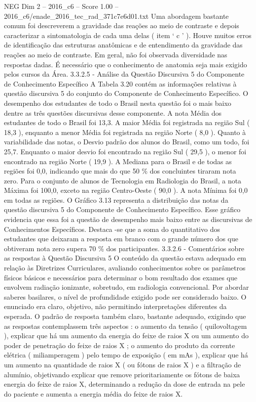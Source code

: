 \begin{textsample}{NEG Dim 2 – 2016\_c6 – Score 1.00 – 2016\_c6/enade\_2016\_tec\_rad\_371c7e6d01.txt}
Uma abordagem bastante comum foi descreverem a gravidade das reações ao meio de contraste e depois caracterizar a sintomatologia de cada uma delas ( item ‘ c ’ ).
Houve muitos erros de identificação das estruturas anatômicas e de entendimento da gravidade das reações ao meio de contraste.
Em geral, não foi observada diversidade nas respostas dadas.
É necessário que o conhecimento de anatomia seja mais exigido pelos cursos da Área. 3.3.2.5 - Análise da Questão Discursiva 5 do Componente de Conhecimento Específico A Tabela 3.20 contém as informações relativas à questão discursiva 5 do conjunto do Componente de Conhecimento Específico.
O desempenho dos estudantes de todo o Brasil nesta questão foi o mais baixo dentre as três questões discursivas desse componente.
A nota Média dos estudantes de todo o Brasil foi 13,3.
A maior Média foi registrada na região Sul ( 18,3 ), enquanto a menor Média foi registrada na região Norte ( 8,0 ).
Quanto à variabilidade das notas, o Desvio padrão dos alunos do Brasil, como um todo, foi 25,7.
Enquanto o maior desvio foi encontrado na região Sul ( 29,5 ), o menor foi encontrado na região Norte ( 19,9 ).
A Mediana para o Brasil e de todas as regiões foi 0,0, indicando que mais do que 50 \% dos concluintes tiraram nota zero.
Para o conjunto de alunos de Tecnologia em Radiologia do Brasil, a nota Máxima foi 100,0, exceto na região Centro-Oeste ( 90,0 ).
A nota Mínima foi 0,0 em todas as regiões.
O Gráfico 3.13 representa a distribuição das notas da questão discursiva 5 do Componente de Conhecimento Específico.
Esse gráfico evidencia que essa foi a questão de desempenho mais baixo entre as discursivas de Conhecimentos Específicos.
Destaca -se que a soma do quantitativo dos estudantes que deixaram a resposta em branco com o grande número dos que obtiveram nota zero supera 70 \% dos participantes. 3.3.2.6 - Comentários sobre as respostas à Questão Discursiva 5 O conteúdo da questão estava adequado em relação às Diretrizes Curriculares, avaliando conhecimentos sobre os parâmetros físicos básicos e necessários para determinar o bom resultado dos exames que envolvem radiação ionizante, sobretudo, em radiologia convencional.
Por abordar saberes basilares, o nível de profundidade exigido pode ser considerado baixo.
O enunciado era claro, objetivo, não permitindo interpretações diferentes da esperada.
O padrão de resposta também claro, bastante adequado, exigindo que as respostas contemplassem três aspectos : o aumento da tensão ( quilovoltagem ), explicar que há um aumento da energia do feixe de raios X ou um aumento do poder de penetração do feixe de raios X ; o aumento do produto da corrente elétrica ( miliamperagem ) pelo tempo de exposição ( em mAs ), explicar que há um aumento na quantidade de raios X ( ou fótons de raios X ) e a filtração de alumínio, objetivando explicar que remove prioritariamente os fótons de baixa energia do feixe de raios X, determinando a redução da dose de entrada na pele do paciente e aumenta a energia média do feixe de raios X.

\end{textsample}
